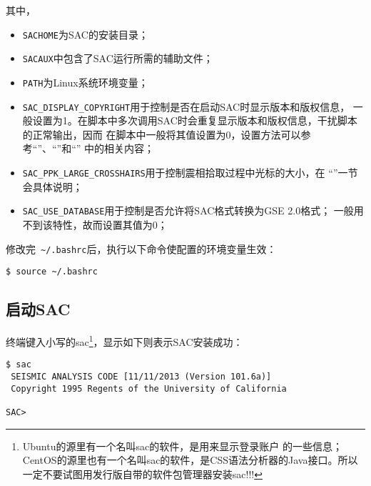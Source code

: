 其中，
\begin{itemize}
\item \verb+SACHOME+为SAC的安装目录；
\item \verb+SACAUX+中包含了SAC运行所需的辅助文件；
\item \verb+PATH+为Linux系统环境变量；
\item \verb+SAC_DISPLAY_COPYRIGHT+用于控制是否在启动SAC时显示版本和版权信息，
    一般设置为1。在脚本中多次调用SAC时会重复显示版本和版权信息，干扰脚本的正常输出，因而
    在脚本中一般将其值设置为0，设置方法可以参考``''、``''和``''
    中的相关内容；
\item \verb+SAC_PPK_LARGE_CROSSHAIRS+用于控制震相拾取过程中光标的大小，在
    ``''一节会具体说明；
\item \verb+SAC_USE_DATABASE+用于控制是否允许将SAC格式转换为GSE 2.0格式；
    一般用不到该特性，故而设置其值为0；
\end{itemize}

修改完~\verb+~/.bashrc+后，执行以下命令使配置的环境变量生效：
\begin{verbatim}
$ source ~/.bashrc
\end{verbatim}

\subsection*{启动SAC}
终端键入小写的sac\footnote{Ubuntu的源里有一个名叫sac的软件，是用来显示登录账户
的一些信息；CentOS的源里也有一个名叫sac的软件，是CSS语法分析器的Java接口。所以
一定不要试图用发行版自带的软件包管理器安装sac!!!}，显示如下则表示SAC安装成功：
\begin{verbatim}
$ sac
 SEISMIC ANALYSIS CODE [11/11/2013 (Version 101.6a)]
 Copyright 1995 Regents of the University of California

SAC>
\end{verbatim}
